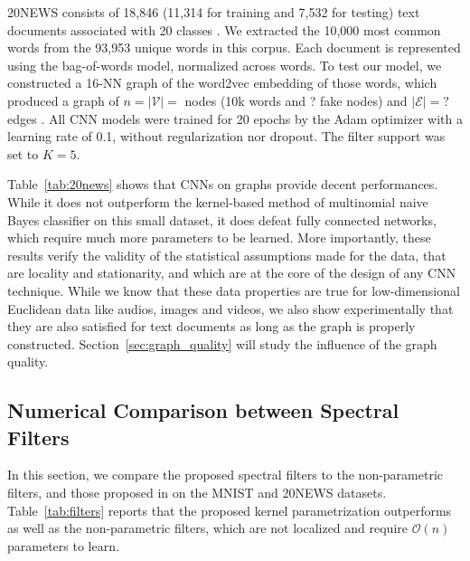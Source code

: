 \documentclass{article}
\newcommand{\V}{\mathcal{V}}
\newcommand{\E}{\mathcal{E}}
\newcommand{\bO}{\mathcal{O}}
\newcommand{\tabref}[1]{Table~\ref{tab:#1}}
\newcommand{\secref}[1]{Section~\ref{sec:#1}}
\newcommand{\bruna}{art:BrunaZarembaSzlamLeCun13DLgraphs,
art:HenaffBrunaLeCun15DLgraphs}
\newcommand{\todo}[1]{{\color{red} #1 }}
\begin{document}
20NEWS consists of 18,846 (11,314 for training and 7,532 for testing) text
documents associated with 20 classes \cite{art:Joachims9620NEWS}. We extracted
the 10,000 most common words from the 93,953 unique words in this corpus. Each
document is represented using the bag-of-words model, normalized across words.
To test our model, we constructed a 16-NN graph of the word2vec
\cite{pro:MikolovChenCorradoDean13word2vec} embedding of those words, which
produced a graph of \todo{$n = |\V| = $ nodes (10k words and ? fake nodes) and
$|\E| = ?$ edges}.  All CNN models were trained for 20 epochs by the Adam
optimizer \cite{art:KingmaBa14AdamOpt} with a learning rate of 0.1, without regularization nor
dropout. The filter support was set to $K = 5$.

\tabref{20news} shows that CNNs on graphs provide decent performances. While it does not outperform the kernel-based method of multinomial naive Bayes classifier on this small dataset, it does defeat fully connected networks, which require much more parameters to be learned. More importantly, these results verify the validity of the statistical assumptions made for the data, that are locality and stationarity, and which are at the core of the design of any CNN technique. While we know that these data properties are true for low-dimensional Euclidean data like audios, images and videos, we also show experimentally that they are also satisfied for text documents as long as the graph is properly constructed. \secref{graph_quality} will study the influence of the graph quality. 










\subsection{Numerical Comparison between Spectral Filters}

In this section, we compare the proposed spectral filters to the non-parametric filters, and those proposed in \cite{\bruna} on the MNIST and 20NEWS datasets. \tabref{filters} reports that the proposed kernel parametrization outperforms
\cite{\bruna} as well as the non-parametric filters, which are not localized and require $\bO(n)$ parameters to learn.
\end{document}
